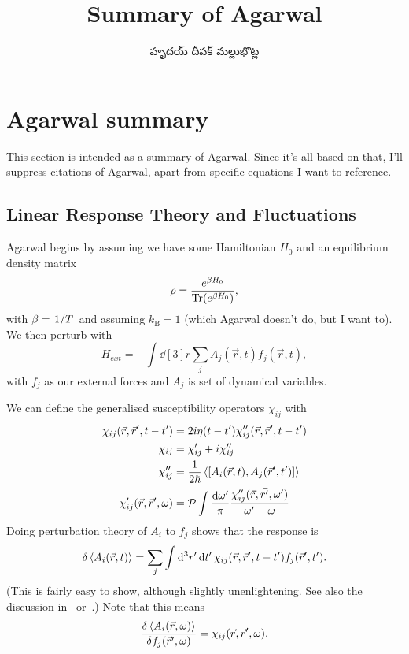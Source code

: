 \documentclass[../main.tex]{subfiles}
\title{Summary of Agarwal}
\author{\begin{telugu}హృదయ్ దీపక్ మల్లుభొట్ల\end{telugu}}
\date{}
\newcommand{\kb}{k_{\mathrm{B}}}
\begin{document}
\onlyinsubfile{\maketitle}
\section{Agarwal summary}\label{sec:AgarwalSummary}

This section is intended as a summary of Agarwal\supercite{Agarwal}.
Since it's all based on that, I'll suppress citations of Agarwal, apart from specific equations I want to reference.

\subsection{Linear Response Theory and Fluctuations} \label{subsec:LrtF}

	Agarwal begins by assuming we have some Hamiltonian $H_0$ and an equilibrium density matrix
	\begin{equation}
		\rho = \frac{e^{\beta H_0}}{\Tr(e^{\beta H_0})},
	\end{equation}
	with $\beta = \flatfrac{1}{T}$ and assuming $\kb = 1$ (which Agarwal doesn't do, but I want to).
	We then perturb with
	\begin{equation}
		H_{ext} = - \int \dd[3]{r} \sum_j A_j(\vec{r}, t) f_j(\vec{r}, t),
	\end{equation}
	with $f_j$ as our external forces and $A_j$ is set of dynamical variables.

	We can define the generalised susceptibility operators $\chi_{ij}$ with
	\begin{align}
		\chi_{ij}(\vec{r}, \vec{r}', t - t') &= 2 i \eta(t - t') \chi''_{ij}(\vec{r}, \vec{r}', t - t') \\
		\chi_{ij} &= \chi'_{ij} + i \chi''_{ij} \\
		\chi''_{ij} &= \frac{1}{2\hbar} \ev{\comm{A_i(\vec{r}, t)}{A_j(\vec{r}', t')}} \\
		\chi'_{ij}(\vec{r}, \vec{r}', \omega) &= \mathcal{P} \int \frac{\dd{\omega'}}{\pi} \frac{\chi''_{ij}(\vec{r}, \vec{r'}, \omega')}{\omega' - \omega}
	\end{align}
	Doing perturbation theory of $A_i$ to $f_j$ shows that the response is
	\begin{equation}
		\delta \ev{A_i(\vec{r}, t)} = \sum_j \int \dd[3]{r'} \dd{t'} \chi_{ij}(\vec{r}, \vec{r}', t - t') f_j(\vec{r}', t').
	\end{equation}
	(This is fairly easy to show, although slightly unenlightening.
	See also the discussion in~\cite{Giuliani2005} or~\cite{Altland}.)
	Note that this means
	\begin{equation}
		\fdv{\ev{A_i(\vec{r}, \omega)}}{f_j(\vec{r}', \omega)} = \chi_{ij}(\vec{r}, \vec{r}', \omega).
	\end{equation}
\end{document}
